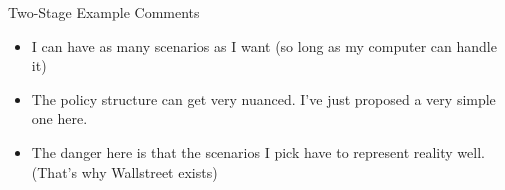 \documentclass[10pt, aspectratio=169]{beamer}
\begin{document}
\begin{frame}{Two-Stage Example Comments}
    \begin{itemize}
        \item I can have as many scenarios as I want (so long as my computer can handle it)
        \item The policy structure can get very nuanced. I've just proposed a very simple one here.
        \item The danger here is that the scenarios I pick have to represent reality well. (That's why Wallstreet exists)
    \end{itemize}
\end{frame}
\end{document}
